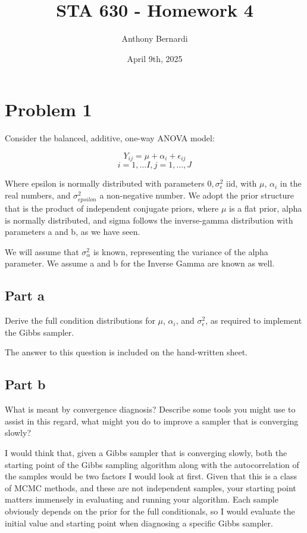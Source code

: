 \documentclass[12pt, letterpaper]{article}
\title{STA 630 - Homework 4}
\author{Anthony Bernardi}
\date{April 9th, 2025}
\begin{document}
\maketitle

\section{Problem 1}

Consider the balanced, additive, one-way ANOVA model: 

\begin{equation}
  Y_{ij} = \mu + \alpha_i + \epsilon_{ij} 
\end{equation} 
\begin{equation}
  i = 1, \dots I, j = 1, \dots, J
\end{equation} 

Where epsilon is normally distributed with parameters ${0, \sigma_{\epsilon}^2}$ iid, with $\mu$, $\alpha_i$ in the real numbers, and $\sigma_{epsilon}^2$ a non-negative number. We adopt the prior structure that is the product of independent conjugate priors, where $\mu$ is a flat prior, alpha is normally distributed, and sigma follows the inverse-gamma distribution with parameters a and b, as we have seen. 

We will assume that $\sigma_{\alpha}^2$ is known, representing the variance of the alpha parameter. We assume a and b for the Inverse Gamma are known as well. 

\subsection{Part a}

Derive the full condition distributions for $\mu$, $\alpha_i$, and $\sigma_{\epsilon}^2$, as required to implement the Gibbs sampler. 

The answer to this question is included on the hand-written sheet. 

\subsection{Part b} 

What is meant by convergence diagnosis? Describe some tools you might use to assist in this regard, what might you do to improve a sampler that is converging slowly?

I would think that, given a Gibbs sampler that is converging slowly, both the starting point of the Gibbs sampling algorithm along with the autocorrelation of the samples would be two factors I would look at first. Given that this is a class of MCMC methods, and these are not independent samples, your starting point matters immensely in evaluating and running your algorithm. Each sample obviously depends on the prior for the full conditionals, so I would evaluate the initial value and starting point when diagnosing a specific Gibbs sampler. 
\end{document}
